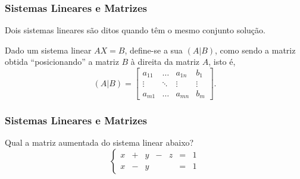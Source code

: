 
\begin{frame}
    \frametitle{Sistemas Lineares e Matrizes}

    \begin{definicao}
        Dois sistemas lineares são ditos  quando têm o mesmo conjunto solução.
    \end{definicao}\pause

    \begin{definicao}
        Dado um sistema linear $AX=B$, define-se a sua  $(A|B)$, como sendo a matriz obtida ``posicionando'' a matriz $B$ à direita da matriz $A$, isto é,
        \begin{displaymath}(A|B)=
            \begin{bmatrix}
                a_{11} & \dots & a_{1n} & b_1\\
                \vdots & \ddots & \vdots & \vdots \\
                a_{m1} & \dots & a_{mn} & b_m
            \end{bmatrix}.
        \end{displaymath}
    \end{definicao}
    
    
\end{frame}




\begin{frame}
    \frametitle{Sistemas Lineares e Matrizes}

    \begin{exemplo}
        Qual a matriz aumentada do sistema linear abaixo?
        $$\left\{
        \begin{array}{rrrrrrr}
        x &+& y &-& z& = &1 \\
        x& -& y& & &=& 1 
        \end{array} \right.$$
    \end{exemplo}

\end{frame}

